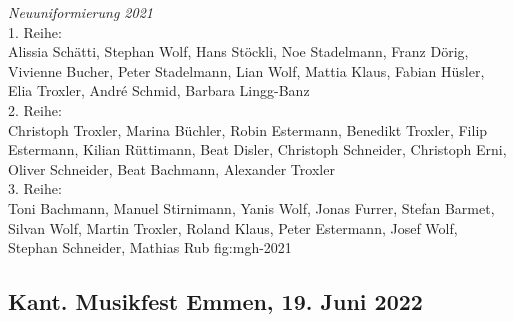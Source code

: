 {\emph{Neuuniformierung 2021}\\
    1. Reihe:\\
    Alissia Schätti, Stephan Wolf, Hans Stöckli, Noe Stadelmann, Franz Dörig,
    Vivienne Bucher, Peter Stadelmann, Lian Wolf, Mattia Klaus, Fabian Hüsler,
    Elia Troxler, André Schmid, Barbara Lingg-Banz\\
    2. Reihe:\\
    Christoph Troxler, Marina Büchler, Robin Estermann, Benedikt Troxler, Filip
    Estermann, Kilian Rüttimann, Beat Disler, Christoph Schneider, Christoph
    Erni, Oliver Schneider, Beat Bachmann, Alexander Troxler\\
    3. Reihe:\\
    Toni Bachmann, Manuel Stirnimann, Yanis Wolf, Jonas Furrer, Stefan Barmet,
    Silvan Wolf, Martin Troxler, Roland Klaus, Peter Estermann, Josef Wolf,
    Stephan Schneider, Mathias Rub } {fig:mgh-2021}


\subsection*{Kant. Musikfest Emmen, 19. Juni 2022}

